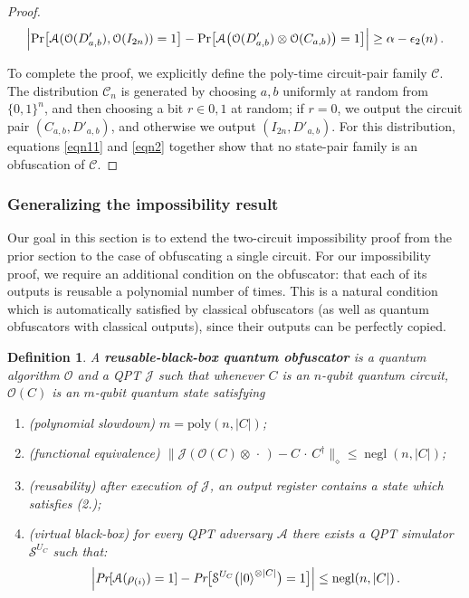 \documentclass[11pt]{article}
\numberwithin{equation}{section}
\newtheorem{definition}{Definition}
\newcommand{\opn}{\operatorname}
\newcommand{\algo}{\mathcal}
\newcommand{\negl}{\opn{negl}}
\begin{document}
{\begin{proof}
\begin{equation}\label{eqn2}
\Bigl| \text{Pr}\bigl[\mathcal A(\mathcal{O}(D'_{a,b}),\mathcal{O}(I_{2n})) = 1\bigr]
- \text{Pr}\bigl[\mathcal A\bigl(\mathcal{O}(D'_{a,b})\otimes\mathcal{O}(C_{a,b})\bigr) = 1\bigr] \Bigr| 
\geq \alpha-\epsilon_2(n)\,.
\end{equation}

To complete the proof, we explicitly define the poly-time circuit-pair family $\mathcal C$. The distribution $\mathcal C_n$ is generated by choosing $a, b$ uniformly at random from $\{0,1\}^n$, and then choosing a bit $r \in {0, 1}$ at random; if $r = 0$, we output the circuit pair $(C_{a,b}, D'_{a,b})$, and otherwise we output $(I_{2n}, D'_{a,b})$. For this distribution, equations \eqref{eqn11} and \eqref{eqn2} together show that no state-pair family is an obfuscation of $\mathcal C$.
\end{proof}

\subsubsection{Generalizing the impossibility result}

Our goal in this section is to extend the two-circuit impossibility proof from the prior section to the case of obfuscating a single circuit. For our impossibility proof, we require an additional condition on the obfuscator: that each of its outputs is reusable a polynomial number of times. This is a natural condition which is automatically satisfied by classical obfuscators (as well as quantum obfuscators with classical outputs), since their outputs can be perfectly copied.

\begin{definition}\label{def:vbb-reusable}
A \textbf{reusable-black-box quantum obfuscator} is a quantum algorithm $\algo O$ and a QPT $\algo J$ such that whenever $C$ is an $n$-qubit quantum circuit, $\mathcal{O}(C)$ is an $m$-qubit quantum state satisfying
\begin{enumerate}
\item (polynomial slowdown)  $m = \text{poly}(n, |C|)$;
\item (functional equivalence) $\bigl\| \algo J ( \mathcal O(C) \otimes \,\cdot\, ) - C \,\cdot\, C^\dagger \bigr\|_\diamond \leq \negl(n, |C|)$;
\item (reusability) after execution of $\algo J$, an output register contains a state which satisfies (2.);
\item (virtual black-box) for every QPT adversary $\mathcal A$ there exists a QPT simulator $\mathcal S^{U_C}$ such that:
$$
\Bigl| \emph{Pr}[\mathcal A(\rho_{(i)}) = 1] - \emph{Pr}\bigl[\mathcal S^{U_C}\bigl(\ket{0}^{\otimes |C|}\bigr) = 1\bigr] \Bigr| \leq \negl(n, |C|)\,.
$$
\end{enumerate}
\end{definition}

}
\end{document}
